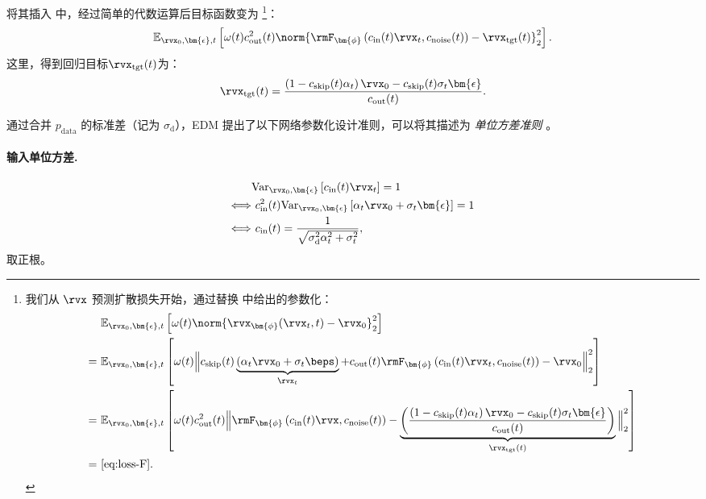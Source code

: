将其插入  中，经过简单的代数运算后目标函数变为 \footnote{ 我们从 $\rvx$ 预测扩散损失开始，通过替换  中给出的参数化：
\begin{align*}
    \begin{aligned}
      &~\mathbb{E}_{\rvx_0, \bm{\epsilon}, t} \left[\omega(t)\norm{ \rvx_{\bm{\phi}}(\rvx_t, t) - \rvx_0}_2^2\right]
      \\= &~\mathbb{E}_{\rvx_0, \bm{\epsilon}, t} \left[\omega(t)\Big\Vert c_{\mathrm{skip}}(t) \underbrace{(\alpha_t \rvx_0+\sigma_t\beps)}_{\rvx_t} + c_{\mathrm{out}}(t) \rmF_{\bm{\phi}}\left(c_{\mathrm{in}}(t) \rvx_t, c_{\mathrm{noise}}(t)\right) - \rvx_0\Big\Vert_2^2\right]
        \\= &~\mathbb{E}_{\rvx_0, \bm{\epsilon}, t} \left[\omega(t)c_{\mathrm{out}}^2(t)\Big\Vert  \rmF_{\bm{\phi}}\left(c_{\mathrm{in}}(t) \rvx, c_{\mathrm{noise}}(t)\right) - \underbrace{\left(\frac{\left(1-c_{\mathrm{skip}}(t)\alpha_t\right)\rvx_0-c_{\mathrm{skip}}(t)\sigma_t \bm{\epsilon}}{c_{\mathrm{out}}(t)}\right)}_{\rvx_{\mathrm{tgt}}(t)}\Big\Vert_2^2\right]
        \\ = &~\text{\Cref{eq:loss-F}}.
    \end{aligned}
\end{align*}

}：
\begin{align}\label{eq:loss-F}
   \mathbb{E}_{\rvx_0, \bm{\epsilon}, t} \left[\omega(t)c_{\mathrm{out}}^2(t)\norm{ \rmF_{\bm{\phi}}\left(c_{\mathrm{in}}(t)\rvx_t, c_{\mathrm{noise}}(t)\right) - \rvx_{\mathrm{tgt}}(t)}_2^2\right].
\end{align}
这里，得到回归目标$\rvx_{\mathrm{tgt}}(t)$为：
\[
\rvx_{\mathrm{tgt}}(t) = \frac{\left(1-c_{\mathrm{skip}}(t)\alpha_t\right)\rvx_0-c_{\mathrm{skip}}(t)\sigma_t \bm{\epsilon}}{c_{\mathrm{out}}(t)}.
\]

通过合并 $p_{\text{data}}$ 的标准差（记为 $\sigma_{\mathrm{d}}$），EDM 提出了以下网络参数化设计准则，可以将其描述为 \emph{ 单位方差准则 }。

\paragraph{ 输入单位方差.}
\begin{align*}
    &\text{Var}_{\rvx_0,\bm{\epsilon}}\left[ c_{\mathrm{in}}(t)\rvx_t\right] = 1 \nonumber
    \\ \Longleftrightarrow &~c_{\mathrm{in}}^2(t) \text{Var}_{\rvx_0,\bm{\epsilon}}\left[ \alpha_t \rvx_0 +\sigma_t \bm{\epsilon} \right] = 1 \nonumber
    \\ \Longleftrightarrow &~c_{\mathrm{in}}(t)  = \frac{1}{\sqrt{\sigma_{\mathrm{d}}^2 \alpha_t^2 + \sigma_t^2}},
\end{align*}
取正根。
